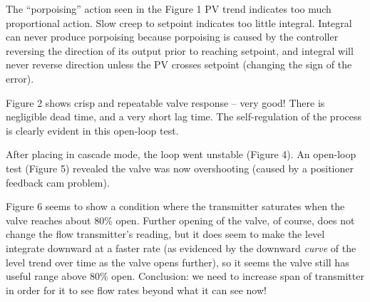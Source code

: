 












The ``porpoising'' action seen in the Figure 1 PV trend indicates too much proportional action.  Slow creep to setpoint indicates too little integral.  Integral can never produce porpoising because porpoising is caused by the controller reversing the direction of its output prior to reaching setpoint, and integral will never reverse direction unless the PV crosses setpoint (changing the sign of the error).

\vskip 10pt

Figure 2 shows crisp and repeatable valve response -- very good!  There is negligible dead time, and a very short lag time.  The self-regulation of the process is clearly evident in this open-loop test.

\vskip 10pt

After placing in cascade mode, the loop went unstable (Figure 4).  An open-loop test (Figure 5) revealed the valve was now overshooting (caused by a positioner feedback cam problem).

\vskip 10pt

Figure 6 seems to show a condition where the transmitter saturates when the valve reaches about 80\% open.  Further opening of the valve, of course, does not change the flow transmitter's reading, but it does seem to make the level integrate downward at a faster rate (as evidenced by the downward {\it curve} of the level trend over time as the valve opens further), so it seems the valve still has useful range above 80\% open.  Conclusion: we need to increase span of transmitter in order for it to see flow rates beyond what it can see now!





